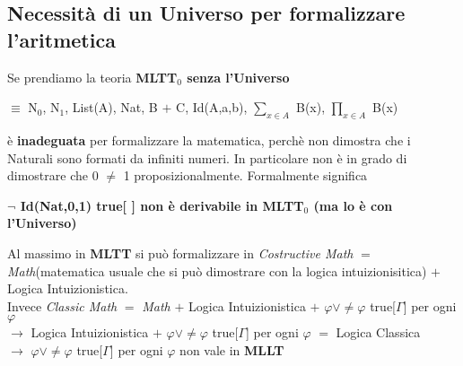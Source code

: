 \subsection{Necessit\`a di un Universo per formalizzare l'aritmetica}
\label{subsec:Necessit\`a-di-un-Universo-per-formalizzare-l'aritmetica}
Se prendiamo la teoria \textbf{MLTT$_0$ senza l'Universo} \begin{center}$\equiv$ N$_0$, N$_1$, List(A), Nat, B $+$ C, Id(A,a,b), $\sum\limits_{x \in A}$ B(x), $\prod\limits_{x \in A}$ B(x)\end{center}
\noindent
\`e \textbf{inadeguata} per formalizzare la matematica, perch\`e non dimostra che i Naturali sono formati da infiniti numeri. In particolare non \`e in grado di dimostrare che 0 $\neq$ 1 proposizionalmente. Formalmente significa
\begin{center}\textbf{$\neg$ Id(Nat,0,1) true[ ] non \`e derivabile in MLTT$_0$ (ma lo \`e con l'Universo)}\end{center}
\noindent
Al massimo in \textbf{MLTT} si pu\`o formalizzare in \textit{Costructive Math} $=$ \textit{Math}(matematica usuale che si pu\`o dimostrare con la logica intuizionisitica) $+$ Logica Intuizionistica.\\
Invece \textit{Classic Math} $=$ \textit{Math} $+$ Logica Intuizionistica $+$ $\varphi \vee \neq\varphi$ true[$\Gamma$] per ogni $\varphi$\\
$\rightarrow$ Logica Intuizionistica $+$ $\varphi \vee \neq\varphi$ true[$\Gamma$] per ogni $\varphi$ $=$ Logica Classica\\
$\rightarrow$ $\varphi \vee \neq\varphi$ true[$\Gamma$] per ogni $\varphi$ non vale in \textbf{MLLT}
